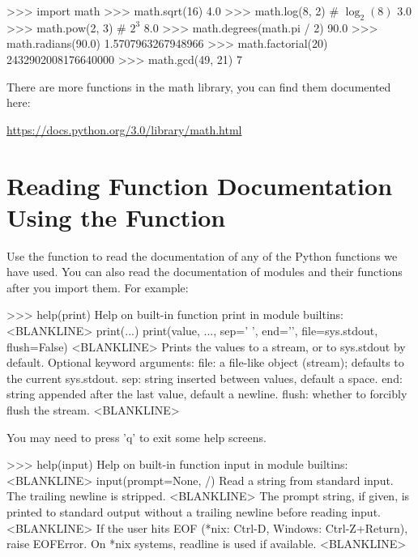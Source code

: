 \documentclass[11pt]{cselabheader}
\begin{document}
\begin{pyconcode}
>>> import math
>>> math.sqrt(16)
4.0
>>> math.log(8, 2) # $\log_2(8)$
3.0
>>> math.pow(2, 3) # $2^3$
8.0
>>> math.degrees(math.pi / 2)
90.0
>>> math.radians(90.0)
1.5707963267948966
>>> math.factorial(20)
2432902008176640000
>>> math.gcd(49, 21)
7

\end{pyconcode}

There are more functions in the math library, you can find them documented here:

\begin{center}
\url{https://docs.python.org/3.0/library/math.html}
\end{center}

\section{\texorpdfstring%
  {Reading Function Documentation Using the  Function}
  {Reading Function Documentation Using the help() Function}}

Use the  function to read the documentation of
any of the Python functions we have used. You can also read the
documentation of modules and their functions after you import them.
For example:

\begin{pyconcode}
>>> help(print)
Help on built-in function print in module builtins:
<BLANKLINE>
print(...)
    print(value, ..., sep=' ', end='\n', file=sys.stdout, flush=False)
<BLANKLINE>
    Prints the values to a stream, or to sys.stdout by default.
    Optional keyword arguments:
    file:  a file-like object (stream); defaults to the current sys.stdout.
    sep:   string inserted between values, default a space.
    end:   string appended after the last value, default a newline.
    flush: whether to forcibly flush the stream.
<BLANKLINE>

\end{pyconcode}

You may need to press 'q' to exit some help screens.

\begin{pyconcode}
>>> help(input)
Help on built-in function input in module builtins:
<BLANKLINE>
input(prompt=None, /)
    Read a string from standard input.  The trailing newline is stripped.
<BLANKLINE>
    The prompt string, if given, is printed to standard output without a
    trailing newline before reading input.
<BLANKLINE>
    If the user hits EOF (*nix: Ctrl-D, Windows: Ctrl-Z+Return), raise EOFError.
    On *nix systems, readline is used if available.
<BLANKLINE>

\end{pyconcode}
\end{document}
